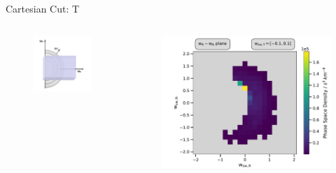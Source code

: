 \documentclass{beamer}
\begin{document}
%
%
%
\begin{frame}[plain]{Cartesian Cut: T}
\begin{columns}
	\column{3cm}
	\begin{figure}
		\includegraphics[scale=.7]{Pics/slice_T2.pdf}
	\end{figure}
	\column{6.5cm}
	\begin{figure}
		\includegraphics[scale=.45]{Pics/slice_psd_T.pdf}
	\end{figure}
	\column{.5cm}
\end{columns}
\end{frame}
\end{document}
